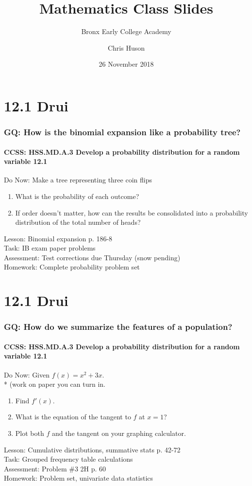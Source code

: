 \documentclass{beamer}
\title{Mathematics Class Slides}
\subtitle{Bronx Early College Academy}
\author{Chris Huson}
\date{26 November 2018}
\begin{document}
\frame{\titlepage}


  \section{12.1 Drui}
  \frame
  {
    \frametitle{GQ: How is the binomial expansion like a probability tree?}
    \framesubtitle{CCSS: HSS.MD.A.3 Develop a probability distribution for a random variable \qquad \alert{12.1}}

    \begin{block}{Do Now: Make a tree representing three coin flips}
    \begin{enumerate}
        \item What is the probability of each outcome?
        \item If order doesn't matter, how can the results be consolidated into a probability distribution of the total number of heads?
    \end{enumerate}
    \end{block}
    Lesson:  Binomial expansion p. 186-8\\%
    Task: IB exam paper problems\\%
    Assessment: Test corrections due Thursday (snow pending)
    \\%
    Homework: Complete probability problem set
  }

  \section{12.1 Drui}
  \frame
  {
    \frametitle{GQ: How do we summarize the features of a population?}
    \framesubtitle{CCSS: HSS.MD.A.3 Develop a probability distribution for a random variable \qquad \alert{12.1}}

    \begin{block}{Do Now: Given $f(x)=x^2+3x$. \\*
    (work on paper you can turn in.}
    \begin{enumerate}
        \item Find $f'(x)$.
        \item What is the equation of the tangent to $f$ at $x=1$?
        \item Plot both $f$ and the tangent on your graphing calculator.
    \end{enumerate}
    \end{block}
    Lesson:  Cumulative distributions, summative stats p. 42-72\\%
    Task: Grouped frequency table calculations\\%
    Assessment: Problem \#3 2H p. 60
    \\%
    Homework: Problem set, univariate data statistics
  }
\end{document}

